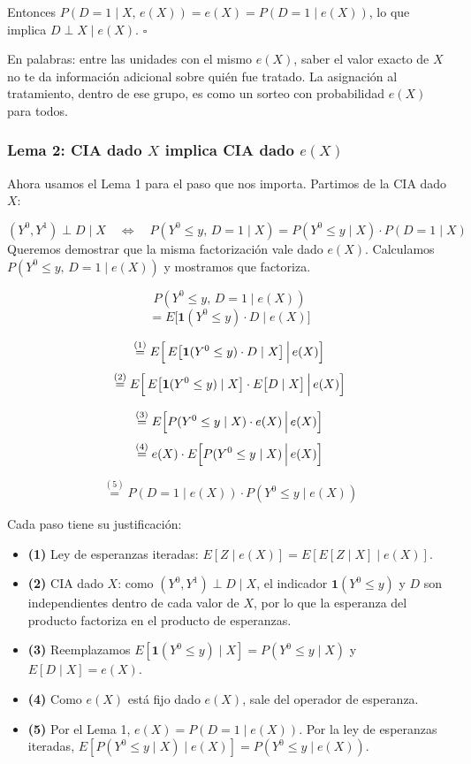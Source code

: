 \documentclass[
  letterpaper,
  DIV=11,
  numbers=noendperiod,
  oneside]{scrreprt}
\providecommand{\tightlist}{%
  \setlength{\itemsep}{0pt}\setlength{\parskip}{0pt}}\usepackage{longtable,booktabs,array}
\begin{document}
\begin{tcolorbox}
Entonces \(P(D = 1 \mid X,\, e(X)) = e(X) = P(D = 1 \mid e(X))\), lo que
implica \(D \perp X \mid e(X)\). \(\square\)

En palabras: entre las unidades con el mismo \(e(X)\), saber el valor
exacto de \(X\) no te da información adicional sobre quién fue tratado.
La asignación al tratamiento, dentro de ese grupo, es como un sorteo con
probabilidad \(e(X)\) para todos.

\hypertarget{lema-2-cia-dado-x-implica-cia-dado-ex}{%
\subsubsection{\texorpdfstring{Lema 2: CIA dado \(X\) implica CIA dado
\(e(X)\)}{Lema 2: CIA dado X implica CIA dado e(X)}}\label{lema-2-cia-dado-x-implica-cia-dado-ex}}

Ahora usamos el Lema 1 para el paso que nos importa. Partimos de la CIA
dado \(X\):

\[(Y^0, Y^1) \perp D \mid X \quad \Longleftrightarrow \quad P(Y^0 \leq y,\, D = 1 \mid X) = P(Y^0 \leq y \mid X) \cdot P(D = 1 \mid X)\]
Queremos demostrar que la misma factorización vale dado \(e(X)\).
Calculamos \(P(Y^0 \leq y,\, D = 1 \mid e(X))\) y mostramos que
factoriza.

\[P(Y^0 \leq y,\, D = 1 \mid e(X))\]
\[= E\bigl[\mathbf{1}(Y^0 \leq y) \cdot D \mid e(X)\bigr]\]

\[\overset{(1)}{=} E\Bigl[\,E\bigl[\mathbf{1}(Y^0 \leq y) \cdot D \mid X\bigr]\,\Big|\, e(X)\Bigr]\]
\[\overset{(2)}{=} E\Bigl[\,E\bigl[\mathbf{1}(Y^0 \leq y) \mid X\bigr] \cdot E\bigl[D \mid X\bigr]\,\Big|\, e(X)\Bigr]\]

\[\overset{(3)}{=} E\Bigl[P(Y^0 \leq y \mid X) \cdot e(X)\,\Big|\, e(X)\Bigr]\]
\[\overset{(4)}{=} e(X) \cdot E\Bigl[P(Y^0 \leq y \mid X)\,\Big|\, e(X)\Bigr]\]

\[\overset{(5)}{=} P(D = 1 \mid e(X)) \cdot P(Y^0 \leq y \mid e(X))\]

Cada paso tiene su justificación:

\begin{itemize}
\tightlist
\item
  \textbf{(1)} Ley de esperanzas iteradas:
  \(E[Z \mid e(X)] = E[E[Z \mid X] \mid e(X)]\).
\item
  \textbf{(2)} CIA dado \(X\): como \((Y^0, Y^1) \perp D \mid X\), el
  indicador \(\mathbf{1}(Y^0 \leq y)\) y \(D\) son independientes dentro
  de cada valor de \(X\), por lo que la esperanza del producto factoriza
  en el producto de esperanzas.
\item
  \textbf{(3)} Reemplazamos
  \(E[\mathbf{1}(Y^0 \leq y) \mid X] = P(Y^0 \leq y \mid X)\) y
  \(E[D \mid X] = e(X)\).
\item
  \textbf{(4)} Como \(e(X)\) está fijo dado \(e(X)\), sale del operador
  de esperanza.
\item
  \textbf{(5)} Por el Lema 1, \(e(X) = P(D = 1 \mid e(X))\). Por la ley
  de esperanzas iteradas,
  \(E[P(Y^0 \leq y \mid X) \mid e(X)] = P(Y^0 \leq y \mid e(X))\).
\end{itemize}


\end{tcolorbox}
\end{document}
